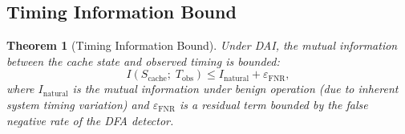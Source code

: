 \documentclass[11pt]{article}
\newtheorem{theorem}{Theorem}
\begin{document}
\subsection{Timing Information Bound}
\label{sec:dai:bound}

\begin{theorem}[Timing Information Bound]
\label{thm:timing-bound}
Under DAI, the mutual information between the cache state and observed timing is bounded:
\begin{equation}
    I(S_{\mathrm{cache}};\; T_{\mathrm{obs}}) \leq I_{\mathrm{natural}} + \varepsilon_{\mathrm{FNR}},
\end{equation}
where $I_{\mathrm{natural}}$ is the mutual information under benign operation
(due to inherent system timing variation) and $\varepsilon_{\mathrm{FNR}}$ is a residual
term bounded by the false negative rate of the DFA detector.
\end{theorem}
\end{document}
